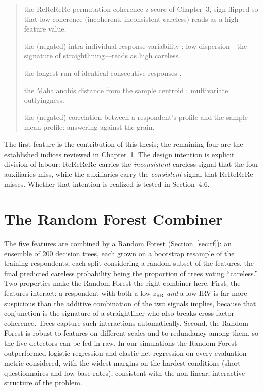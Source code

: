 \begin{quote}
\small
\begin{description}\setlength{\itemsep}{2pt}
\item[$z_{\text{RR}}$] the ReReReRe permutation coherence z-score of Chapter~3,
  sign-flipped so that low coherence (incoherent, inconsistent careless) reads
  as a high feature value.
\item[IRV] the (negated) intra-individual response variability
  \parencite{dunn2018intra}: low dispersion---the signature of
  straightlining---reads as high careless.
\item[LongString] the longest run of identical consecutive responses
  \parencite{johnson2005ascertaining}.
\item[$D^2$] the Mahalanobis distance from the sample centroid
  \parencite{mahalanobis1936generalised}: multivariate outlyingness.
\item[Person--Total] the (negated) correlation between a respondent's profile
  and the sample mean profile: answering against the grain.
\end{description}
\end{quote}

The first feature is the contribution of this thesis; the remaining four are the
established indices reviewed in Chapter~1. The design intention is explicit
division of labour: ReReReRe carries the \emph{inconsistent}-careless signal that
the four auxiliaries miss, while the auxiliaries carry the \emph{consistent}
signal that ReReReRe misses. Whether that intention is realized is tested in
Section~4.6.

\section{The Random Forest Combiner}

The five features are combined by a Random Forest (Section~\ref{sec:rf}): an ensemble of
200 decision trees, each grown on a bootstrap resample of the training
respondents, each split considering a random subset of the features, the final
predicted careless probability being the proportion of trees voting
``careless.'' Two properties make the Random Forest the right combiner here.
First, the features interact: a respondent with both a low $z_{\text{RR}}$
\emph{and} a low IRV is far more suspicious than the additive combination of the
two signals implies, because that conjunction is the signature of a
straightliner who also breaks cross-factor coherence. Trees capture such
interactions automatically. Second, the Random Forest is robust to features on
different scales and to redundancy among them, so the five detectors can be fed
in raw. In our simulations the Random Forest outperformed logistic regression
and elastic-net regression on every evaluation metric considered, with the
widest margins on the hardest conditions (short questionnaires and low base
rates), consistent with the non-linear, interactive structure of the problem.

